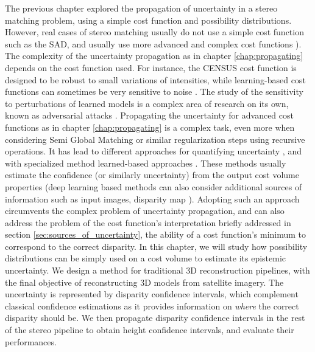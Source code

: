 The previous chapter explored the propagation of uncertainty in a stereo matching problem, using a simple cost function and possibility distributions. However, real cases of stereo matching usually do not use a simple cost function such as the SAD, and usually use more advanced and complex cost functions \cite{zabih_non-parametric_1994,zbontar_stereo_2016,laga_survey_2022}). The complexity of the uncertainty propagation as in chapter \ref{chap:propagating} depends on the cost function used. For instance, the CENSUS cost function \cite{zabih_non-parametric_1994} is designed to be robust to small variations of intensities, while learning-based cost functions can sometimes be very sensitive to noise \cite{szegedy_intriguing_2013,carlini_towards_2017}. The study of the sensitivity to perturbations of learned models is a complex area of research on its own, known as adversarial attacks \cite{chen_shapeshifter_2018, zhao_seeing_2019}. Propagating the uncertainty for advanced cost functions as in chapter \ref{chap:propagating} is a complex task, even more when considering Semi Global Matching or similar regularization steps using recursive operations. It has lead to different approaches for quantifying uncertainty \cite{hu_quantitative_2012}, and with specialized method learned-based approaches \cite{laga_survey_2022,poggi_confidence_2021,wang_uncertainty_2022}. These methods usually estimate the confidence (or similarly uncertainty) from the output cost volume properties (deep learning based methods can also consider additional sources of information such as input images, disparity map \etc). Adopting such an approach circumvents the complex problem of uncertainty propagation, and can also address the problem of the cost function's interpretation briefly addressed in section \ref{sec:sources_of_uncertainty}, \ie the ability of a cost function's minimum to correspond to the correct disparity. In this chapter, we will study how possibility distributions can be simply used on a cost volume to estimate its epistemic uncertainty. We design a method for traditional 3D reconstruction pipelines, with the final objective of reconstructing 3D models from satellite imagery. The uncertainty is represented by disparity confidence intervals, which complement classical confidence estimations as it provides information on \textit{where} the correct disparity should be. We then propagate disparity confidence intervals in the rest of the stereo pipeline to obtain height confidence intervals, and evaluate their performances.

